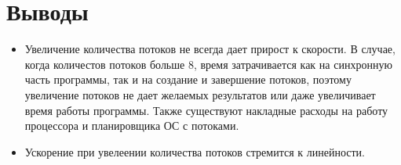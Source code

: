 \section{Выводы}
\begin{itemize}
\item Увеличение количества потоков не всегда дает прирост к скорости. В случае, когда количестов потоков больше 8, время затрачивается как на синхронную часть программы, так и на создание и завершение потоков, поэтому увеличение потоков не дает желаемых результатов или даже увеличивает время работы программы. Также существуют накладные расходы на работу процессора и планировщика ОС с потоками.
\item Ускорение при увелеении количества потоков стремится к линейности.
\end{itemize}
\pagebreak